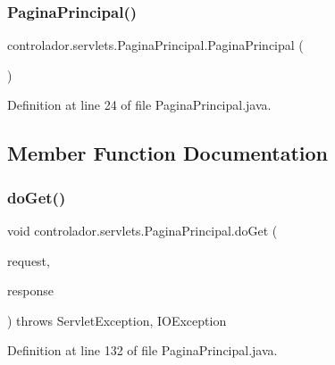 \subsubsection{\texorpdfstring{Pagina\+Principal()}{PaginaPrincipal()}}
{\footnotesize\ttfamily controlador.\+servlets.\+Pagina\+Principal.\+Pagina\+Principal (\begin{DoxyParamCaption}{ }\end{DoxyParamCaption})}



Definition at line 24 of file Pagina\+Principal.\+java.



\subsection{Member Function Documentation}
\hypertarget{classcontrolador_1_1servlets_1_1PaginaPrincipal_a1ebdc5a022ce170f3648fe141f9e1480}{}\label{classcontrolador_1_1servlets_1_1PaginaPrincipal_a1ebdc5a022ce170f3648fe141f9e1480} 
\subsubsection{\texorpdfstring{do\+Get()}{doGet()}}
{\footnotesize\ttfamily void controlador.\+servlets.\+Pagina\+Principal.\+do\+Get (\begin{DoxyParamCaption}\item[{Http\+Servlet\+Request}]{request,  }\item[{Http\+Servlet\+Response}]{response }\end{DoxyParamCaption}) throws Servlet\+Exception, I\+O\+Exception\hspace{0.3cm}{\ttfamily [protected]}}



Definition at line 132 of file Pagina\+Principal.\+java.

\hypertarget{classcontrolador_1_1servlets_1_1PaginaPrincipal_ae33ae6fe9a5e9b39a5d9d58041b8b3ad}{}\label{classcontrolador_1_1servlets_1_1PaginaPrincipal_ae33ae6fe9a5e9b39a5d9d58041b8b3ad} 
